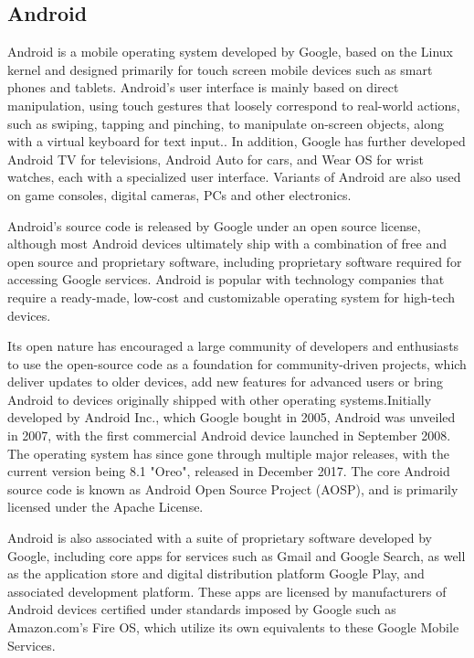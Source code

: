 \documentclass[a4paper,12pt]{article}
\begin{document}
\subsection{Android}\vspace{5mm}
Android is a mobile operating system developed by Google, based on the Linux kernel  and designed primarily for touch screen mobile devices such  as smart phones and tablets. Android's user interface is mainly based on direct manipulation, using touch gestures that loosely correspond to real-world actions, such as swiping, tapping and pinching, to manipulate on-screen objects, along with a virtual keyboard for text input.. In addition, Google has further developed Android TV for televisions, Android Auto for cars, and Wear OS for wrist watches, each with a specialized user interface. Variants of Android are also used on game consoles, digital cameras, PCs and other electronics.\par\vspace{2mm}
Android's source code is released by Google under an open source license, although most Android devices ultimately ship with a combination of free and open source and proprietary software, including proprietary software required for accessing Google services. Android is popular with technology companies that require a ready-made, low-cost and customizable operating system for high-tech devices.
\par\vspace{2mm}
 Its open nature has encouraged a large community of developers and enthusiasts to use the open-source code as a foundation for community-driven projects, which deliver updates to older devices, add new features for advanced users or bring Android to devices originally shipped with other operating systems.Initially developed by Android Inc., which Google bought in 2005, Android was unveiled in 2007, with the first commercial Android device launched in September 2008. The operating system has since gone through multiple major releases, with the current version being 8.1 "Oreo", released in December 2017. The core Android source code is known as Android Open Source Project (AOSP), and is primarily licensed under the Apache License.\par\vspace{2mm}
Android is also associated with a suite of proprietary software developed by Google, including core apps for services such as Gmail and Google Search, as well as the application store and digital distribution platform Google Play, and associated development platform. These apps are licensed by manufacturers of Android devices certified under standards imposed by Google such as Amazon.com's Fire OS, which utilize its own equivalents to these Google Mobile Services.
\par\vspace{2mm}
\newpage
\end{document}
